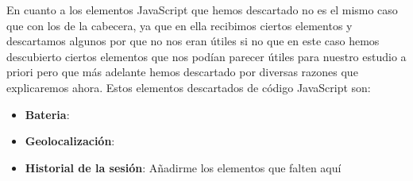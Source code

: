 En cuanto a los elementos JavaScript que hemos descartado no es el mismo caso que con los de la cabecera, ya que en ella recibimos ciertos elementos y descartamos algunos por que no nos eran útiles si no que en este caso hemos descubierto ciertos elementos que nos podían parecer útiles para nuestro estudio a priori pero que más adelante hemos descartado por diversas razones que explicaremos ahora. Estos elementos descartados de código JavaScript son:
\begin{itemize}
    \item \textbf{Bateria}:
    \item \textbf{Geolocalización}:
    \item \textbf{Historial de la sesión}:
    Añadirme los elementos que falten aquí
\end{itemize}